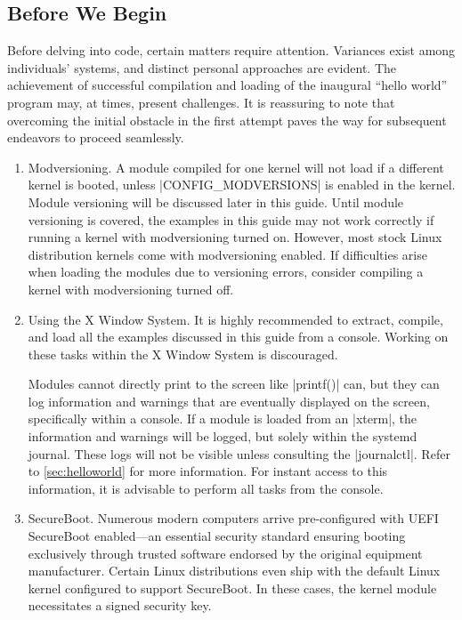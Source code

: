\documentclass[10pt, oneside]{book}
\begin{document}
\subsection{Before We Begin}
\label{sec:preparation}
Before delving into code, certain matters require attention.
Variances exist among individuals' systems, and distinct personal approaches are evident.
The achievement of successful compilation and loading of the inaugural ``hello world'' program may,
at times, present challenges.
It is reassuring to note that overcoming the initial obstacle in the first attempt paves the way for subsequent endeavors to proceed seamlessly.

\begin{enumerate}
  \item Modversioning.
        A module compiled for one kernel will not load if a different kernel is booted,
        unless \cpp|CONFIG_MODVERSIONS| is enabled in the kernel.
        Module versioning will be discussed later in this guide.
        Until module versioning is covered, the examples in this guide may not work correctly if running a kernel with modversioning turned on.
        However, most stock Linux distribution kernels come with modversioning enabled.
        If difficulties arise when loading the modules due to versioning errors, consider compiling a kernel with modversioning turned off.

  \item Using the X Window System.
        It is highly recommended to extract, compile, and load all the examples discussed in this guide from a console.
        Working on these tasks within the X Window System is discouraged.

        Modules cannot directly print to the screen like \cpp|printf()| can,
        but they can log information and warnings that are eventually displayed on the screen,
        specifically within a console.
        If a module is loaded from an \sh|xterm|, the information and warnings will be logged,
        but solely within the systemd journal. These logs will not be visible unless consulting the \sh|journalctl|.
        Refer to \ref{sec:helloworld} for more information.
        For instant access to this information, it is advisable to perform all tasks from the console.
  \item SecureBoot.
        Numerous modern computers arrive pre-configured with UEFI SecureBoot enabled—an essential security standard ensuring booting exclusively through trusted software endorsed by the original equipment manufacturer.
        Certain Linux distributions even ship with the default Linux kernel configured to support SecureBoot.
        In these cases, the kernel module necessitates a signed security key.


\end{enumerate}
\end{document}
